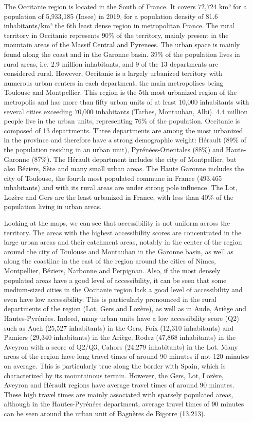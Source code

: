 The Occitanie region is located in the South of France. It covers 72,724 km² for
a population of 5,933,185 (Insee) in 2019, for a population density of 81.6
inhabitants/km² the 6th least dense region in metropolitan France. The rural
territory in Occitanie represents 90\% of the territory, mainly present in the
mountain areas of the Massif Central and Pyrenees. The urban space is mainly
found along the coast and in the Garonne basin. 39\% of the population lives in
rural areas, i.e. 2.9 million inhabitants, and 9 of the 13 departments are
considered rural. However, Occitanie is a largely urbanized territory with
numerous urban centers in each department, the main metropolises being Toulouse
and Montpellier. This region is the 5th most urbanized region of the metropolis
and has more than fifty urban units of at least 10,000 inhabitants with several
cities exceeding 70,000 inhabitants (Tarbes, Montauban, Albi). 4.4 million
people live in the urban units, representing 76\% of the population. Occitanie
is composed of 13 departments. Three departments are among the most urbanized in
the province and therefore have a strong demographic weight: Hérault (89\% of
the population residing in an urban unit), Pyrénées-Orientales (88\%) and
Haute-Garonne (87\%). The Hérault department includes the city of Montpellier,
but also Béziers, Sète and many small urban areas. The Haute Garonne includes
the city of Toulouse, the fourth most populated commune in France (493,465
inhabitants) and with its rural areas are under strong pole influence.  The Lot,
Lozère and Gers are the least urbanized in France, with less than 40\% of the
population living in urban areas.

Looking at the maps, we can see that accessibility is not uniform across the
territory. The areas with the highest accessibility scores are concentrated in
the large urban areas and their catchment areas, notably in the center of the
region around the city of Toulouse and Montauban in the Garonne basin, as well
as along the coastline in the east of the region around the cities of Nîmes,
Montpellier, Béziers, Narbonne and Perpignan. Also, if the most
densely populated areas have a good level of accessibility, it can be seen that
some medium-sized cities in the Occitanie region lack a good level of
accessibility and even have low accessibility. This is particularly pronounced
in the rural departments of the region (Lot, Gers and Lozère), as well as in
Aude, Ariège and Hautes-Pyrénées. Indeed, many urban units have a low
accessibility score (Q2) such as Auch (25,527 inhabitants) in the Gers, Foix
(12,310 inhabitants) and Pamiers (29,340 inhabitants) in the Ariège, Rodez
(47,868 inhabitants) in the Aveyron with a score of Q2/Q3, Cahors (24,279
inhabitants) in the Lot. Many areas of the region have long travel times of
around 90 minutes if not 120 minutes on average. This is particularly true along
the border with Spain, which is characterized by its mountainous terrain.
However, the Gers, Lot, Lozère, Aveyron and Hérault regions have average travel
times of around 90 minutes. These high travel times are mainly associated with
sparsely populated areas, although in the Hautes-Pyrénées department, average
travel times of 90 minutes can be seen around the urban unit of Bagnères de
Bigorre (13,213).


